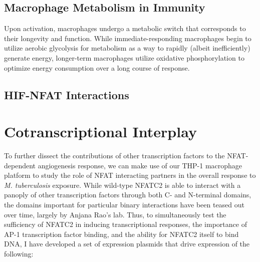 \subsection{Macrophage Metabolism in Immunity}

Upon activation, macrophages undergo a metabolic switch that corresponds to their longevity and function. While immediate-responding macrophages begin to utilize aerobic glycolysis for metabolism as a way to rapidly (albeit inefficiently) generate energy, longer-term macrophages utilize oxidative phosphorylation to optimize energy consumption over a long course of response. 

\subsection{HIF-NFAT Interactions}

\citep{WalczakDrzewiecka2008}

\section{Cotranscriptional Interplay}

To further dissect the contributions of other transcription factors to the NFAT-dependent angiogenesis response, we can make use of our THP-1 macrophage platform to study the role of NFAT interacting partners in the overall response to \textit{M. tuberculosis} exposure. While wild-type NFATC2 is able to interact with a panoply of other transcription factors through both C- and N-terminal domains, the domains important for particular binary interactions have been teased out over time, largely by Anjana Rao's lab. Thus, to simultaneously test the sufficiency of NFATC2 in inducing transcriptional responses, the importance of AP-1 transcription factor binding, and the ability for NFATC2 itself to bind DNA, I have developed a set of expression plasmids that drive expression of the following:

\singlespacing

